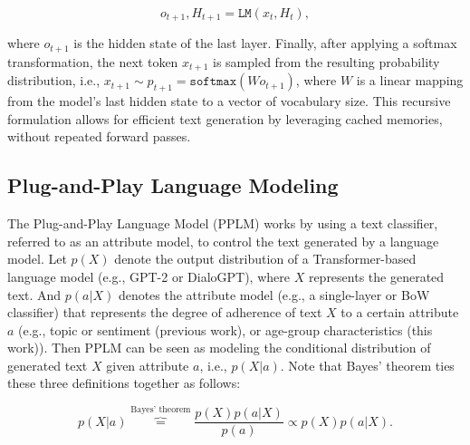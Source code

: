 \begin{equation}
    o_{t + 1}, H_{t + 1} = \texttt{LM} \left( x_t, H_t \right),
\end{equation}

where $o_{t + 1}$ is the hidden state of the last layer. Finally, after applying a softmax transformation, the next token $x_{t + 1}$ is sampled from the resulting probability distribution, i.e.,  $x_{t + 1} \sim p_{t + 1} = \texttt{softmax} \left( W o_{t + 1} \right)$, where $W$ is a linear mapping from the model's last hidden state to a vector of vocabulary size. This recursive formulation allows for efficient text generation by leveraging cached memories, without repeated forward passes.

\subsection{Plug-and-Play Language Modeling}
\label{sec:ppm}

The Plug-and-Play Language Model (PPLM) \cite{dathathri2019plug} works by using a text classifier, referred to as an attribute model, to control the text generated by a language model. Let $p(X)$ denote the output distribution of a Transformer-based language model (e.g., GPT-2 or DialoGPT), where $X$ represents the generated text. And $p(a | X)$ denotes the attribute model (e.g., a single-layer or BoW classifier) that represents the degree of adherence of text $X$ to a certain attribute $a$ (e.g., topic or sentiment (previous work), or age-group characteristics (this work)). Then PPLM can be seen as modeling the conditional distribution of generated text $X$ given attribute $a$, i.e., $p(X | a)$. Note that Bayes' theorem ties these three definitions together as follows:

\begin{equation}
    p(X | a) \overbrace{=}^{\text{Bayes' theorem}} 
    \frac{p(X) p(a | X)}{p(a)} \propto
    p(X)p(a | X).
\end{equation}

